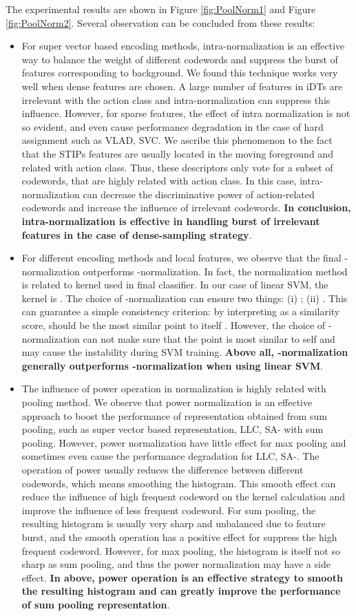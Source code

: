 \documentclass[twocolumn]{svjour3}          \smartqed  \usepackage{slashbox}
\begin{document}
The experimental results are shown in Figure \ref{fig:PoolNorm1} and Figure \ref{fig:PoolNorm2}. Several observation can be concluded from these results:
\begin{itemize}
  \item For super vector based encoding methods, intra-normalization is an effective way to balance the weight of different codewords and suppress the burst of features corresponding to background. We found this technique works very well when dense features are chosen. A large number of features in iDTs are irrelevant with the action class and intra-normalization can suppress this influence. However, for sparse features, the effect of intra normalization is not so evident, and even cause performance degradation in the case of hard assignment such as VLAD, SVC. We ascribe  this phenomenon to the fact that the STIPs features are usually located in the moving foreground and related with action class. Thus, these descriptors only vote for a subset of codewords, that are highly related with action class. In this case, intra-normalization can decrease the discriminative power of action-related codewords and increase the influence of irrelevant codewords. \textbf{In conclusion, intra-normalization is effective in handling burst of irrelevant features in the case of dense-sampling strategy}.
  \item For different encoding methods and local features, we observe that the final -normalization outperforms -normalization. In fact, the normalization method is related to kernel used in final classifier. In our case of linear SVM, the kernel is . The choice of -normalization can ensure two things: (i) ; (ii) . This can guarantee a simple consistency criterion: by interpreting  as a similarity score,  should be the most similar point to itself \cite{VedaldiZ12}. However, the choice of -normalization can not make sure that the point is most similar to self and may cause the instability during SVM training. \textbf{Above all, -normalization generally outperforms -normalization when using linear SVM}.
  \item The influence of power operation in normalization is highly related with pooling method. We observe that power normalization is an effective approach to boost the performance of representation obtained from sum pooling, such as super vector based representation, LLC, SA- with sum pooling. However, power normalization have little effect for max pooling and sometimes even cause the performance degradation for LLC, SA-. The operation of power usually reduces the difference between different codewords, which means smoothing the histogram. This smooth effect can reduce the influence of high frequent codeword on the kernel calculation and improve the influence of less frequent codeword. For sum pooling, the resulting histogram is usually very sharp and unbalanced due to feature burst, and the smooth operation has a positive effect for suppress the high frequent codeword. However, for max pooling, the histogram is itself not so sharp as sum pooling, and thus the power normalization may have a side effect. \textbf{In above, power operation is an effective strategy to smooth the resulting histogram and can greatly improve the performance of sum pooling representation}.

\end{itemize}
\end{document}
